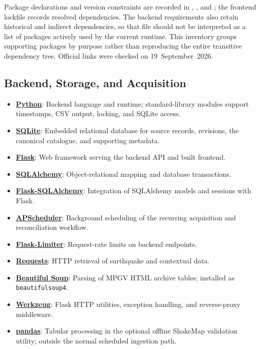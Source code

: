 \documentclass[12pt]{article}
\begin{document}
Package declarations and version constraints are recorded in , , and ; the frontend lockfile records resolved dependencies. The backend requirements also retain historical and indirect dependencies, so that file should not be interpreted as a list of packages actively used by the current runtime. This inventory groups supporting packages by purpose rather than reproducing the entire transitive dependency tree. Official links were checked on 19~September~2026.

\subsection*{Backend, Storage, and Acquisition}
\begin{itemize}
    \item \href{https://www.python.org/}{\textbf{Python}}: Backend language and runtime; standard-library modules support timestamps, CSV output, locking, and SQLite access.
    \item \href{https://www.sqlite.org/}{\textbf{SQLite}}: Embedded relational database for source records, revisions, the canonical catalogue, and supporting metadata.
    \item \href{https://flask.palletsprojects.com/}{\textbf{Flask}}: Web framework serving the backend API and built frontend.
    \item \href{https://www.sqlalchemy.org/}{\textbf{SQLAlchemy}}: Object-relational mapping and database transactions.
    \item \href{https://flask-sqlalchemy.palletsprojects.com/}{\textbf{Flask-SQLAlchemy}}: Integration of SQLAlchemy models and sessions with Flask.
    \item \href{https://apscheduler.readthedocs.io/}{\textbf{APScheduler}}: Background scheduling of the recurring acquisition and reconciliation workflow.
    \item \href{https://flask-limiter.readthedocs.io/}{\textbf{Flask-Limiter}}: Request-rate limits on backend endpoints.
    \item \href{https://requests.readthedocs.io/}{\textbf{Requests}}: HTTP retrieval of earthquake and contextual data.
    \item \href{https://www.crummy.com/software/BeautifulSoup/bs4/doc/}{\textbf{Beautiful Soup}}: Parsing of MPGV HTML archive tables; installed as \texttt{beautifulsoup4}.
    \item \href{https://werkzeug.palletsprojects.com/}{\textbf{Werkzeug}}: Flask HTTP utilities, exception handling, and reverse-proxy middleware.
    \item \href{https://pandas.pydata.org/}{\textbf{pandas}}: Tabular processing in the optional offline ShakeMap validation utility; outside the normal scheduled ingestion path.
\end{itemize}
\end{document}
